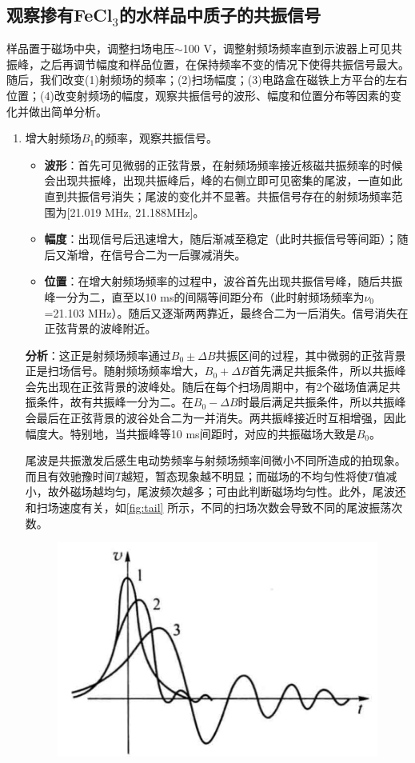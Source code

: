\documentclass[font=default]{mpltx}
\begin{document}
\subsection{观察掺有FeCl$_3$的水样品中质子的共振信号}
样品置于磁场中央，调整扫场电压$\sim$100 V，调整射频场频率直到示波器上可见共振峰，之后再调节幅度和样品位置，在保持频率不变的情况下使得共振信号最大。随后，我们改变(1)射频场的频率；(2)扫场幅度；(3)电路盒在磁铁上方平台的左右位置；(4)改变射频场的幅度，观察共振信号的波形、幅度和位置分布等因素的变化并做出简单分析。
\begin{enumerate}
  \item 增大射频场$B_1$的频率，观察共振信号。
  \begin{itemize}
  \item \textbf{波形}：首先可见微弱的正弦背景，在射频场频率接近核磁共振频率的时候会出现共振峰，出现共振峰后，峰的右侧立即可见密集的尾波，一直如此直到共振信号消失；尾波的变化并不显著。共振信号存在的射频场频率范围为[21.019 MHz, 21.188MHz]。
  \item \textbf{幅度}：出现信号后迅速增大，随后渐减至稳定（此时共振信号等间距）；随后又渐增，在信号合二为一后骤减消失。
  \item \textbf{位置}：在增大射频场频率的过程中，波谷首先出现共振信号峰，随后共振峰一分为二，直至以10 ms的间隔等间距分布（此时射频场频率为$\nu_0$=21.103 MHz）。随后又逐渐两两靠近，最终合二为一后消失。信号消失在正弦背景的波峰附近。
  \end{itemize}
\textbf{分析}：这正是射频场频率通过$B_0\pm\Delta B$共振区间的过程，其中微弱的正弦背景正是扫场信号。随射频场频率增大，$B_0+\Delta B$首先满足共振条件，所以共振峰会先出现在正弦背景的波峰处。随后在每个扫场周期中，有2个磁场值满足共振条件，故有共振峰一分为二。在$B_0-\Delta B$时最后满足共振条件，所以共振峰会最后在正弦背景的波谷处合二为一并消失。两共振峰接近时互相增强，因此幅度大。特别地，当共振峰等10 ms间距时，对应的共振磁场大致是$B_0$。\par
尾波是共振激发后感生电动势频率与射频场频率间微小不同所造成的拍现象。而且有效驰豫时间$T$越短，暂态现象越不明显；而磁场的不均匀性将使$T$值减小，故外磁场越均匀，尾波频次越多；可由此判断磁场均匀性。此外，尾波还和扫场速度有关，如\autoref{fig:tail} 所示，不同的扫场次数会导致不同的尾波振荡次数。
\begin{figure}
  \centering
  \includegraphics[width=0.4\linewidth]{fig/tail.png}

\end{figure}
\end{enumerate}
\end{document}
